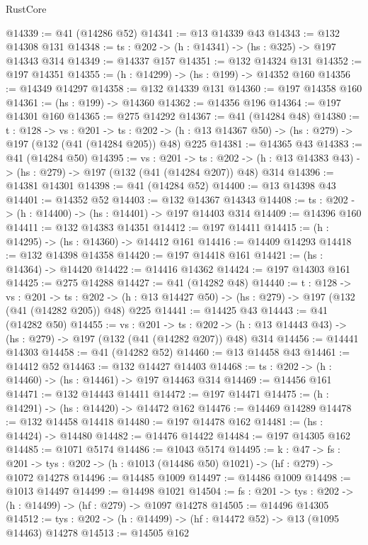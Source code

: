 \begin{lexlean}{RustCore}
\begin{coremodule}
@14339 := @41 (@14286 @52)
@14341 := @13 @14339 @43
@14343 := @132 @14308 @131
@14348 := {ts : @202} -> (h : @14341) -> (hs : @325) -> @197 @14343 @314
@14349 := @14337 @157
@14351 := @132 @14324 @131
@14352 := @197 @14351
@14355 := (h : @14299) -> (hs : @199) -> @14352 @160
@14356 := @14349 @14297
@14358 := @132 @14339 @131
@14360 := @197 @14358 @160
@14361 := (hs : @199) -> @14360
@14362 := @14356 @196
@14364 := @197 @14301 @160
@14365 := @275 @14292
@14367 := @41 (@14284 @48)
@14380 := {t : @128} ->
  {vs : @201} ->
  {ts : @202} -> (h : @13 @14367 @50) -> (hs : @279) -> @197 (@132 (@41 (@14284 @205)) @48) @225
@14381 := @14365 @43
@14383 := @41 (@14284 @50)
@14395 := {vs : @201} ->
  {ts : @202} -> (h : @13 @14383 @43) -> (hs : @279) -> @197 (@132 (@41 (@14284 @207)) @48) @314
@14396 := @14381 @14301
@14398 := @41 (@14284 @52)
@14400 := @13 @14398 @43
@14401 := @14352 @52
@14403 := @132 @14367 @14343
@14408 := {ts : @202} -> (h : @14400) -> (hs : @14401) -> @197 @14403 @314
@14409 := @14396 @160
@14411 := @132 @14383 @14351
@14412 := @197 @14411
@14415 := (h : @14295) -> (hs : @14360) -> @14412 @161
@14416 := @14409 @14293
@14418 := @132 @14398 @14358
@14420 := @197 @14418 @161
@14421 := (hs : @14364) -> @14420
@14422 := @14416 @14362
@14424 := @197 @14303 @161
@14425 := @275 @14288
@14427 := @41 (@14282 @48)
@14440 := {t : @128} ->
  {vs : @201} ->
  {ts : @202} -> (h : @13 @14427 @50) -> (hs : @279) -> @197 (@132 (@41 (@14282 @205)) @48) @225
@14441 := @14425 @43
@14443 := @41 (@14282 @50)
@14455 := {vs : @201} ->
  {ts : @202} -> (h : @13 @14443 @43) -> (hs : @279) -> @197 (@132 (@41 (@14282 @207)) @48) @314
@14456 := @14441 @14303
@14458 := @41 (@14282 @52)
@14460 := @13 @14458 @43
@14461 := @14412 @52
@14463 := @132 @14427 @14403
@14468 := {ts : @202} -> (h : @14460) -> (hs : @14461) -> @197 @14463 @314
@14469 := @14456 @161
@14471 := @132 @14443 @14411
@14472 := @197 @14471
@14475 := (h : @14291) -> (hs : @14420) -> @14472 @162
@14476 := @14469 @14289
@14478 := @132 @14458 @14418
@14480 := @197 @14478 @162
@14481 := (hs : @14424) -> @14480
@14482 := @14476 @14422
@14484 := @197 @14305 @162
@14485 := @1071 @5174
@14486 := @1043 @5174
@14495 := {k : @47} ->
  {fs : @201} -> {tys : @202} -> (h : @1013 (@14486 @50) @1021) -> (hf : @279) -> @1072 @14278
@14496 := @14485 @1009
@14497 := @14486 @1009
@14498 := @1013 @14497
@14499 := @14498 @1021
@14504 := {fs : @201} -> {tys : @202} -> (h : @14499) -> (hf : @279) -> @1097 @14278
@14505 := @14496 @14305
@14512 := {tys : @202} -> (h : @14499) -> (hf : @14472 @52) -> @13 (@1095 @14463) @14278
@14513 := @14505 @162

\end{coremodule}
\end{lexlean}
